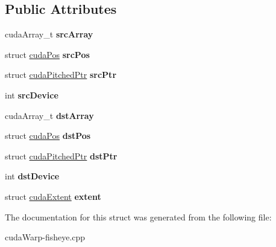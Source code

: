\subsection*{Public Attributes}
\begin{DoxyCompactItemize}
\item 
cuda\+Array\+\_\+t {\bfseries src\+Array}\hypertarget{structcudaMemcpy3DPeerParms_a8fe697f001a7881de7fc3da7a2d7067d}{}\label{structcudaMemcpy3DPeerParms_a8fe697f001a7881de7fc3da7a2d7067d}

\item 
struct \hyperlink{structcudaPos}{cuda\+Pos} {\bfseries src\+Pos}\hypertarget{structcudaMemcpy3DPeerParms_af999a690f44190bd75c457aacd17ee53}{}\label{structcudaMemcpy3DPeerParms_af999a690f44190bd75c457aacd17ee53}

\item 
struct \hyperlink{structcudaPitchedPtr}{cuda\+Pitched\+Ptr} {\bfseries src\+Ptr}\hypertarget{structcudaMemcpy3DPeerParms_a082cafa2c17253515b0fcec2247aa44d}{}\label{structcudaMemcpy3DPeerParms_a082cafa2c17253515b0fcec2247aa44d}

\item 
int {\bfseries src\+Device}\hypertarget{structcudaMemcpy3DPeerParms_a88f676f69dc4eb2780604b5dd401507f}{}\label{structcudaMemcpy3DPeerParms_a88f676f69dc4eb2780604b5dd401507f}

\item 
cuda\+Array\+\_\+t {\bfseries dst\+Array}\hypertarget{structcudaMemcpy3DPeerParms_af9c67633106e8055cb1ddd644d4c27ec}{}\label{structcudaMemcpy3DPeerParms_af9c67633106e8055cb1ddd644d4c27ec}

\item 
struct \hyperlink{structcudaPos}{cuda\+Pos} {\bfseries dst\+Pos}\hypertarget{structcudaMemcpy3DPeerParms_ac60edd974f14fa236d12dfce8e422999}{}\label{structcudaMemcpy3DPeerParms_ac60edd974f14fa236d12dfce8e422999}

\item 
struct \hyperlink{structcudaPitchedPtr}{cuda\+Pitched\+Ptr} {\bfseries dst\+Ptr}\hypertarget{structcudaMemcpy3DPeerParms_a4b1d1f37d556bf4b4099a40b8dbe9048}{}\label{structcudaMemcpy3DPeerParms_a4b1d1f37d556bf4b4099a40b8dbe9048}

\item 
int {\bfseries dst\+Device}\hypertarget{structcudaMemcpy3DPeerParms_a0e6bbb47774d03ee4c700e664648c121}{}\label{structcudaMemcpy3DPeerParms_a0e6bbb47774d03ee4c700e664648c121}

\item 
struct \hyperlink{structcudaExtent}{cuda\+Extent} {\bfseries extent}\hypertarget{structcudaMemcpy3DPeerParms_a05e977ef43361e5c6f3815b9c9afab59}{}\label{structcudaMemcpy3DPeerParms_a05e977ef43361e5c6f3815b9c9afab59}

\end{DoxyCompactItemize}


The documentation for this struct was generated from the following file\+:\begin{DoxyCompactItemize}
\item 
cuda\+Warp-\/fisheye.\+cpp\end{DoxyCompactItemize}
